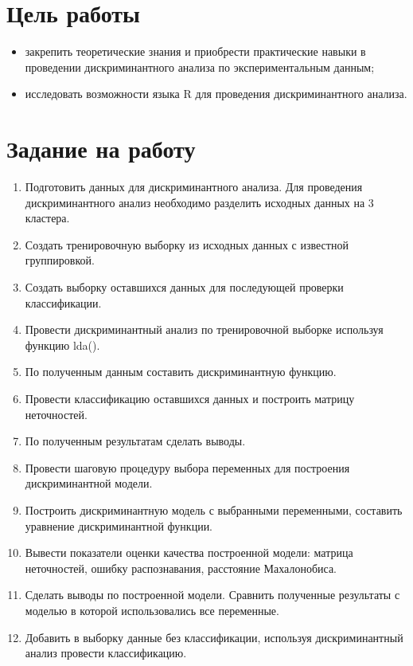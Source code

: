 \documentclass[a4paper,14pt]{extarticle}
\begin{document}


\section{Цель работы}
\begin{itemize}
    \item закрепить теоретические знания и приобрести практические навыки в
          проведении дискриминантного анализа по экспериментальным данным;
    \item исследовать возможности языка R для проведения дискриминантного
    анализа.
\end{itemize}

\section{Задание на работу}
\begin{enumerate}
    \item Подготовить данных для дискриминантного анализа. Для проведения
          дискриминантного анализ необходимо разделить исходных данных на 3
          кластера.
    \item Создать тренировочную выборку из исходных данных с известной
          группировкой.
    \item Создать выборку оставшихся данных для последующей проверки
          классификации.
    \item Провести дискриминантный анализ по тренировочной выборке используя
          функцию lda().
    \item По полученным данным составить дискриминантную функцию.
    \item Провести классификацию оставшихся данных и построить матрицу
          неточностей.
    \item По полученным результатам сделать выводы.
    \item Провести шаговую процедуру выбора переменных для построения
          дискриминантной модели.
    \item Построить дискриминантную модель с выбранными переменными, составить
          уравнение дискриминантной функции.
    \item Вывести показатели оценки качества построенной модели: матрица
          неточностей, ошибку распознавания, расстояние Махалонобиса.
    \item Сделать выводы по построенной модели. Сравнить полученные результаты с
          моделью в которой использовались все переменные.
    \item Добавить в выборку данные без классификации, используя дискриминантный
          анализ провести классификацию.
\end{enumerate}
\end{document}
